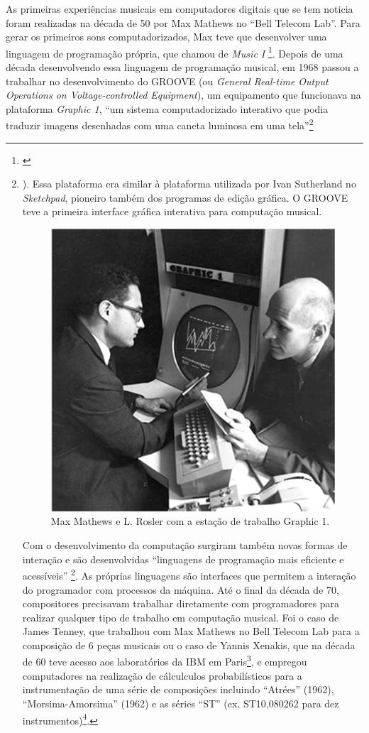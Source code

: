 As primeiras experiências musicais em computadores digitais que se tem noticia foram realizadas na década de 50 por Max Mathews no ``Bell Telecom Lab''. Para gerar os primeiros sons computadorizados, Max teve que desenvolver uma linguagem de programação própria, que chamou de \emph{Music I} \footnote{\cite[253]{Holmes1985}}. Depois de uma década desenvolvendo essa linguagem de programação musical, em 1968 passou a trabalhar no desenvolvimento do GROOVE (ou \emph{General Real-time Output Operations on Voltage-controlled Equipment}), um equipamento que funcionava na plataforma \emph{Graphic 1}, ``um sistema computadorizado interativo que podia traduzir imagens desenhadas com uma caneta luminosa em uma tela''\footnote{\cite[253]{Holmes1985}). Essa plataforma era similar à plataforma utilizada por Ivan Sutherland no \emph{Sketchpad}, pioneiro também dos programas de edição gráfica. O GROOVE teve a primeira interface gráfica interativa para computação musical. 

\begin{figure}
    \caption{\label{max}Max Mathews e L. Rosler com a estação de trabalho Graphic 1. }
    
        \includegraphics[width=0.5\linewidth]{pictures/MaxHolmes-251}
    
\end{figure}

Com o desenvolvimento da computação surgiram também novas formas de interação e são desenvolvidas ``linguagens de programação mais eficiente e acessíveis'' \footnote{\cite[111]{IAZZETTA1997}}. As próprias linguagens são interfaces que permitem a interação do programador com processos da máquina. Até o final da década de 70, compositores precisavam trabalhar diretamente com programadores para realizar qualquer tipo de trabalho em computação musical. Foi o caso de James Tenney, que trabalhou com Max Mathews no Bell Telecom Lab para a composição de 6 peças musicais ou o caso de Yannis Xenakis, que na década de 60 teve acesso aos laboratórios da IBM em Paris\footnote{\cite{Holmes1985}}, e empregou computadores na realização de cálculculos probabilísticos para a instrumentação de uma série de composições incluindo ``Atrées'' (1962), ``Morsima-Amorsima'' (1962) e as séries ``ST'' (ex. ST\/10,080262 para dez instrumentos)\footnote{idem p. 263}.

}
